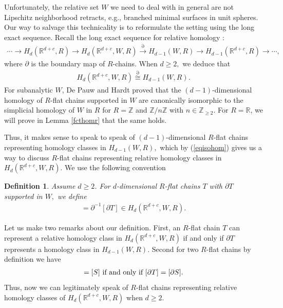 \documentclass[11pt,a4paper]{amsart}
\numberwithin{equation}{section}
\newcommand{\m}{^{-1}}
\newcommand{\pd}{\partial}
\newcommand{\R}{\mathbb{R}}
\newcommand{\Z}{\mathbb{Z}}
\theoremstyle{plain}
\newtheorem{defn}{Definition}[subsection]
\theoremstyle{definition}
\numberwithin{equation}{subsection}
\begin{document}
Unfortunately, the relative set $W$ we need to deal with in general are not Lipschitz neighborhood retracts, e.g., branched minimal surfaces in unit spheres. Our way to salvage this technicality is to reformulate the setting using the long exact sequence. Recall the long exact sequence for relative homology \cite[Theorem 2.16]{AH}:
\begin{align*}
	\cdots\to H_d(\R^{d+c},R)\to H_d(\R^{d+c},W,R)\xrightarrow{\pd} H_{d-1}(W,R)\to H_{d-1}(\R^{d+c},R)\to\cdots,
\end{align*}where $\pd$ is the boundary map of $R$-chains.
When $d\ge 2,$ we deduce that
\begin{align}\label{eqisohom}
	H_d(\R^{d+c},W,R)\overset{\pd}{\cong} H_{d-1}(W,R).
\end{align}
For subanalytic $W$, De Pauw and Hardt  \cite[Section 5.3]{DHlii} proved that the $(d-1)$-dimensional homology of $R$-flat chains supported in $W$ are canonically isomorphic to the simplicial homology of $W$ in $R$ for $R=\Z$ and $\Z/n\Z$ with $n\in\Z_{\ge2}$. For $R=\R$, we will prove in Lemma \ref{fcthomr} that the same holds.

Thus, it makes sense to speak to speak of $(d-1)$-dimensional $R$-flat chains representing homology classes in $H_{d-1}(W,R),$ which by (\ref{eqisohom}) gives us a way to discuss $R$-flat chains representing relative homology classes in $H_d(\R^{d+c},W,R)$. We use the following convention
\begin{defn}\label{defntsw}
Assume $d\ge 2$. For $d$-dimensional $R$-flat chains $T$ with $\pd T$ supported in $W,$ we define
\begin{align*}
	[T]=\pd\m[\pd T]\in H_d(\R^{d+c},W,R). 
\end{align*}
\end{defn}
Let us make two remarks about our definition. First, an $R$-flat chain $T$ can represent a relative homology class in $H_d(\R^{d+c},W,R)$ if and only if $\pd T$ represents a homology class in $H_{d-1}(W,R).$ Second for two $R$-flat chains by definition we have
\begin{align*}
	[T]=[S]\textnormal{ if and only if }[\pd T]=[\pd S].
\end{align*}  Thus, now we can legitimately speak of $R$-flat chains representing relative homology classes of $H_d(\R^{d+c},W,R)$ when $d\ge 2.$
\end{document}
